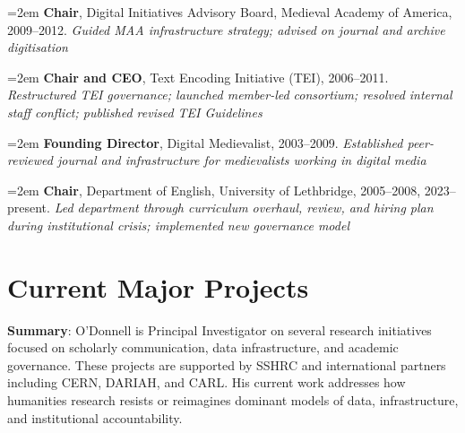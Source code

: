 \documentclass[12pt]{article}
\begin{document}
{\hangindent=2em
\noindent
\textbf{Chair}, Digital Initiatives Advisory Board, Medieval Academy of America, 2009–2012. \textit{Guided MAA infrastructure strategy; advised on journal and archive digitisation}


\hangindent=2em
\noindent
\textbf{Chair and CEO}, Text Encoding Initiative (TEI), 2006–2011. \textit{Restructured TEI governance; launched member-led consortium; resolved internal staff conflict; published revised TEI Guidelines}


\hangindent=2em
\noindent
\textbf{Founding Director}, Digital Medievalist, 2003–2009. \textit{Established peer-reviewed journal and infrastructure for medievalists working in digital media}


\hangindent=2em
\noindent
\textbf{Chair}, Department of English, University of Lethbridge, 2005–2008, 2023–present. \textit{Led department through curriculum overhaul, review, and hiring plan during institutional crisis; implemented new governance model}

}

\section*{Current Major Projects}

\textbf{Summary}: O'Donnell is Principal Investigator on several research initiatives focused on scholarly communication, data infrastructure, and academic governance. These projects are supported by SSHRC and international partners including CERN, DARIAH, and CARL. His current work addresses how humanities research resists or reimagines dominant models of data, infrastructure, and institutional accountability.
\end{document}
